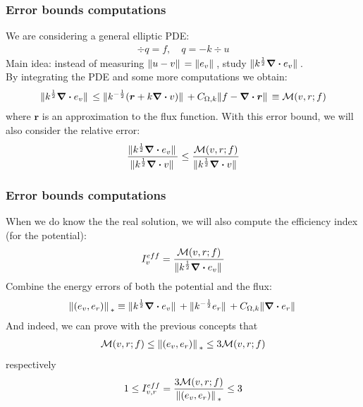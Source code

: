 \documentclass[t]{beamer}
\begin{document}
\begin{frame}
\frametitle{Error bounds computations}
We are considering a general elliptic PDE:
\begin{align*}
\div q = f , \quad q =-k \div u
\end{align*}
Main idea: instead of measuring $\norm*{u-v} = \norm*{e_v}$, study $\norm*{k^{\frac{1}{2}}\div e_v}$. 
\\ By integrating the PDE and some more computations we obtain:
\begin{align*}
\norm*{k^{\frac{1}{2}}\div e_v} \leq \norm*{k^{-\frac{1}{2}}(\bm{r}+k\div v)} + C_{\Omega,k}\norm*{f-\div \bm{r}} \equiv \mathcal{M}(v,r;f)
\end{align*}
where $\bm{r}$ is an approximation to the flux function.
With this error bound, we will also consider the \alert{relative error}:
\begin{align*}
\frac{\norm*{k^{\frac{1}{2}}\div e_v}}{\norm*{k^{\frac{1}{2}}\div v}} \leq \frac{\mathcal{M}(v,r;f)}{\norm*{k^{\frac{1}{2}}\div v}}
\end{align*}

\end{frame}

\begin{frame}
\frametitle{Error bounds computations}
When we do know the the real solution, we will also compute the \alert{efficiency index} (for the potential):
\begin{align*}
I_v^{eff} = \frac{\mathcal{M}(v,r;f)}{\norm*{k^{\frac{1}{2}}\div e_v}}
\end{align*}
Combine the energy errors of both the potential and the flux:
\begin{align*}
\norm*{(e_v,e_r)}_{*} \equiv \norm*{k^{\frac{1}{2}}\div e_v} + \norm*{k^{-\frac{1}{2}}e_r} + C_{\Omega,k}\norm*{\div e_r}
\end{align*} 
And indeed, we can prove with the previous concepts that 
\begin{align*}
\mathcal{M}(v,r;f) \leq  \norm*{(e_v,e_r)}_{*}  \leq 3\mathcal{M}(v,r;f)
\end{align*}
respectively
\begin{align*}
1 \leq I_{v,r}^{eff} = \frac{3\mathcal{M}(v,r;f) }{\norm*{(e_v,e_r)}_{*}} \leq 3
\end{align*}
\end{frame}
\end{document}
